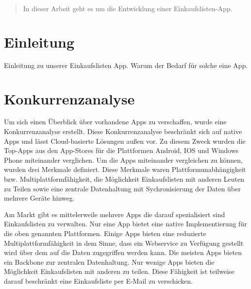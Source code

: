 \documentclass[10pt, conference, compsocconf]{IEEEtran}
\begin{document}
\begin{abstract}
In dieser Arbeit geht es um die Entwicklung einer Einkaufslisten-App.

\end{abstract}

%


%
\IEEEpeerreviewmaketitle



\section{Einleitung}
Einleitung zu unserer Einkaufslisten App. Warum der Bedarf f\"ur solche eine App. 

\section{Konkurrenzanalyse}
Um sich einen \"Uberblick über vorhandene Apps zu verschaffen, wurde eine Konkurrenzanalyse erstellt.
Diese Konkurrenzanalyse beschr\"ankt sich auf native Apps und lässt Cloud-basierte Lösungen außen vor.
Zu diesem Zweck wurden die Top-Apps aus den App-Stores für die Plattformen Android, IOS und Windows Phone miteinander verglichen.
Um die Apps miteinander vergleichen zu können, wurden drei Merkmale definiert. 
Diese Merkmale waren Plattformunabh\"angigkeit bzw. Multiplattformf\"ahigkeit, 
die M\"oglichkeit Einkaufslisten mit anderen Leuten zu Teilen sowie eine zentrale Datenhaltung mit Sychronisierung der Daten über mehrere Geräte hinweg.

Am Markt gibt es mittelerweile mehrere Apps die darauf spezialisiert sind Einkaufslisten zu verwalten.
Nur eine App bietet eine native Implementierung für die oben genannten Plattformen. Einige Apps bieten eine reduzierte Multiplattformf\"ahigkeit in dem Sinne, dass ein Webservice zu Verfügung gestellt wird über dem auf die Daten zugegriffen werden kann.
Die meisten Apps bieten ein Backbone zur zentralen Datenhaltung.
Nur wenige Apps bieten die Möglichkeit Einkaufslisten mit anderen zu teilen. Diese F\"ahigkeit ist teilweise darauf beschr\"ankt eine Einkaufsliste per E-Mail zu 
verschicken.
\end{document}
